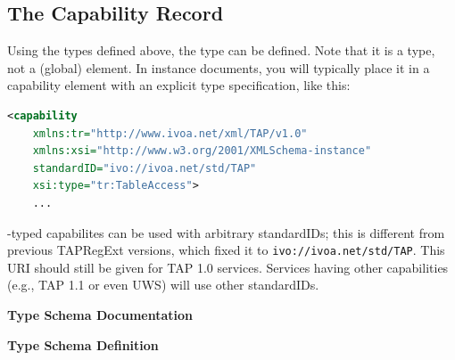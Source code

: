 \documentclass{ivoa}
\begin{document}
\subsection{The Capability Record}

\label{caprec}

Using the types defined above, the 
 type can be defined.  Note that
it is a type, not a (global) element.  In instance documents, you
will typically place it in a capability element with an explicit
type specification, like this:


\begin{lstlisting}[language=XML,basicstyle=\footnotesize]
  <capability 
    xmlns:tr="http://www.ivoa.net/xml/TAP/v1.0" 
    xmlns:xsi="http://www.w3.org/2001/XMLSchema-instance" 
    standardID="ivo://ivoa.net/std/TAP" 
    xsi:type="tr:TableAccess">
    ...
\end{lstlisting}

-typed capabilites can be used with arbitrary
standardIDs; this is different from previous TAPRegExt versions, which
fixed it to \nolinkurl{ivo://ivoa.net/std/TAP}.  This URI should still
be given for TAP 1.0 services.  Services having other capabilities
(e.g., TAP 1.1 or even UWS) will use other standardIDs.

\begingroup
      	\renewcommand*\descriptionlabel[1]{%
      	\hbox to 5.5em{\emph{#1}\hfil}}\vspace{2ex}\noindent\textbf{ Type Schema Documentation}



\vspace{1ex}\noindent\textbf{ Type Schema Definition}
\end{document}
